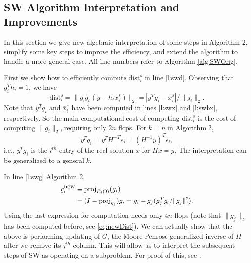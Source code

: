 \documentclass[12pt,Bold,letterpaper]{mcgilletdclass}
\newcommand{\dist}{\mathrm{dist}}
\newcommand{\vsp}{\vspace{\baselineskip}}
\begin{document}
\vsp \subsection{SW Algorithm Interpretation and Improvements}
\label{sec:improvedSW}
In this section we give new algebraic interpretation of some steps in Algorithm 2,
simplify some key steps to improve the efficiency,
and  extend the algorithm to handle a more general case.
All line numbers refer to Algorithm \ref{alg:SWOrig}.

First we show  how to efficiently compute $\dist_i^s$ in line \ref{l:swd}. 
Observing that $g_i^Th_i = 1$, we have
\begin{equation}
\label{eq:newDist}
\dist_i^s =   \|  g_ig_i^\dag (y-h_i\bar{x}_i^s)  \|_2 
=    | y^Tg_i -\bar{x}_i^s |/\| g_i  \|_2.
\end{equation} 
Note that $y^Tg_i$ and $\bar{x}_i^s$ have been computed in lines \ref{l:swx} and \ref{l:swbx}, respectively.
So the main computational cost of computing $\dist_i^s$ is the cost of computing $\|g_i\|_2$,
requiring only $2n$ flops. 
For $k=n$ in Algorithm 2,  $$y^Tg_i=y^TH^{-T}e_i=(H^{-1}y)^Te_i,$$ i.e.,  $y^Tg_i$
is the $i^{th}$ entry of the real solution $x$ for $Hx=y$. 
The interpretation can be generalized to  a general $k$. 

In line \ref{l:swg} Algorithm 2,  
\begin{align}
g_i^{\small \mbox{new}} & \equiv \mbox{proj}_{F_j(0)}(g_i)   \nonumber \\
  & =(I- \mbox{proj}_{g_j})g_i=g_i- g_j(g_j^Tg_i/\|g_j\|_2^2). \label{eq:gup}
\end{align}
Using the last expression for computation needs only $4n$ flops
(note that $\|g_j\|_2$ has been computed before, see \eqref{eq:newDist}).
We can actually show that the above is performing updating of $G$, the Moore-Penrose generalized inverse of
$H$ after we remove its $j^{th}$ column. This will allow us to interpret the subsequent steps of SW as operating on a subproblem. For proof of this, see \cite{Cli64}.
\end{document}
